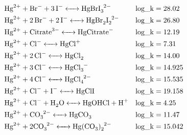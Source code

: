 \documentclass[12pt, a4paper]{article}
\begin{document}
\begin{align}
& \ce{Hg^2+ + Br^- + 3I- <-> HgBrI_3^2-} && \mathrm{log\_k} = 28.02 \\
& \ce{Hg^2+ + 2Br^- + 2I- <-> HgBr_2I_2^2-} && \mathrm{log\_k} = 26.80 \\
& \ce{Hg^2+ + Citrate^3- <-> HgCitrate-} && \mathrm{log\_k} = 12.19 \\
& \ce{Hg^2+ + Cl^- <-> HgCl^+} && \mathrm{log\_k} = 7.31 \\
& \ce{Hg^2+ + 2Cl^- <-> HgCl2} && \mathrm{log\_k} = 14.00 \\
& \ce{Hg^2+ + 3Cl^- <-> HgCl_3^-} && \mathrm{log\_k} = 14.925 \\
& \ce{Hg^2+ + 4Cl^- <-> HgCl_4^2-} && \mathrm{log\_k} = 15.535 \\
& \ce{Hg^2+ + Cl^- + I- <-> HgClI} && \mathrm{log\_k} = 19.158 \\
& \ce{Hg^2+ + Cl^- + H2O <-> HgOHCl + H+} && \mathrm{log\_k} = 4.25 \\
& \ce{Hg^2+ + CO3^2- <-> HgCO3} && \mathrm{log\_k} = 11.47 \\
& \ce{Hg^2+ + 2 CO3^2- <-> Hg(CO3)_2^2-} && \mathrm{log\_k} = 15.042 \\

\end{align}
\end{document}
